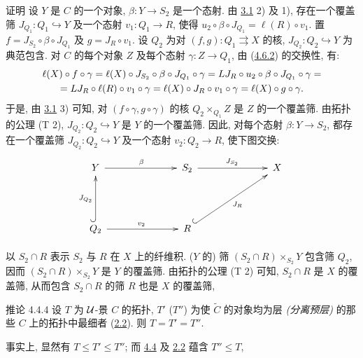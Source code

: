 \begin{enonce*}[remark]{证明}
设 $Y$ 是 $C$ 的一个对象, $\beta:Y\rightarrow S_2$ 是一个态射.
由 \hyperref[II.lem3.1]{3.1} 2) 及 1),
存在一个覆盖筛 $J_{Q_1}:Q_1\hookrightarrow Y$
及一个态射 $v_1:Q_1\rightarrow R$,
使得 $u_2\circ\beta\circ J_{Q_1}=\ell(R)\circ v_1$.
置 $f=J_{S_{2}}\circ \beta\circ J_{Q_1}$ 及 $g=J_R\circ v_1$.
设 $Q_2$ 为对 $(f,g):Q_1\rightrightarrows X$ 的核,
$J_{Q_2}:Q_2\hookrightarrow Y$ 为典范包含.
对 $C$ 的每个对象 $Z$ 及每个态射 $\gamma:Z\rightarrow Q_1$,
由 (\hyperlink{sga4.exp.II.equation.4.6.2}{4.6.2}) 的交换性, 有:
\begin{gather*}
\ell(X)\circ f\circ \gamma =\ell(X)\circ J_{S_2}\circ \beta\circ
J_{Q_1}\circ \gamma =LJ_R\circ u_2\circ \beta\circ J_{Q_1}\circ \gamma=\\
=LJ_R\circ \ell(R)\circ v_1\circ \gamma =\ell (X)\circ J_R\circ
v_1\circ \gamma = \ell(X)\circ g\circ \gamma{}.
\end{gather*}
于是\pageoriginale{}, 由 \hyperref[II.lem3.1]{3.1} 3) 可知,
对 $(f\circ\gamma,g\circ\gamma)$ 的核 $Q_2\times_{Q_1}Z$
是 $Z$ 的一个覆盖筛.
由拓扑的公理 (T 2),
$J_{Q_2}:Q_2\hookrightarrow Y$ 是 $Y$ 的一个覆盖筛.
因此, 对每个态射 $\beta:Y\rightarrow S_2$,
都存在一个覆盖筛 $J_{Q_2}:Q_2\hookrightarrow Y$
及一个态射 $v_2:Q_2\rightarrow R$, 使下图交换:
\[
\xymatrix@C=2.5cm@R=1.5cm@M=.2cm{
Y\ar[r]^{\beta}   & S_2\ar[r]^{J_{S_2}} & X\\
Q_2 \ar[r]^{v_2} \ar@{^{(}->}[u]^{J_{Q_2}}& R
\ar@{^{(}->}[ru]_{J_{R}}  &}
\]

以 $S_2\cap R$ 表示 $S_2$ 与 $R$ 在 $X$ 上的纤维积.
($Y$ 的) 筛 $(S_2\cap R)\times_{S_2}Y$ 包含筛 $Q_2$,
因而 $(S_2\cap R)\times_{S_2}Y$ 是 $Y$ 的覆盖筛.
由拓扑的公理 (T 2) 可知, $S_2\cap R$ 是 $X$ 的覆盖筛,
从而包含 $S_2\cap R$ 的筛 $R$ 也是 $X$ 的覆盖筛, \cqfd
\end{enonce*}

\setcounter{subsubsection}{3}
\begin{enonce*}{推论 4.4.4}
设 $T$ 为 ${\mathcal U}$-景 $C$ 的拓扑,
$T'$ (\resp $T''$) 为使 $\widetilde{C}$ 的对象均为层
\emph{(\resp 分离预层)} 的那些 $C$ 上的拓扑中最细者
(\hyperref[II.prop2.2]{2.2}). 则 $T=T'=T''$.
\end{enonce*}

事实上, 显然有 $T\leq T'\leq T''$;
而 \hyperref[II.theo4.4]{4.4} 及 \hyperref[II.prop2.2]{2.2}
蕴含 $T''\leq T$, \cqfd



